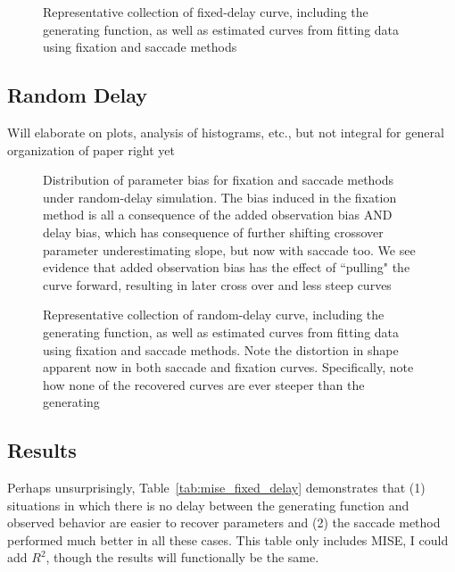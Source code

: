 \documentclass{article}
\begin{document}
\begin{figure}[H]
\centering
\caption{Representative collection of fixed-delay curve, including  the generating function, as well as estimated curves from fitting data using fixation and saccade methods}
\label{fig:fixed_pb_curves}
\end{figure}

\subsection{Random Delay}


Will elaborate on plots, analysis of histograms, etc., but not integral for general organization of paper right yet


\begin{figure}[H]
    \centering
\caption{Distribution of parameter bias for fixation and saccade methods under random-delay simulation. The bias induced in the fixation method is all a consequence of the added observation bias AND delay bias, which has consequence of further shifting crossover parameter underestimating slope, but now with saccade too. We see evidence that added observation bias has the effect of ``pulling" the curve forward, resulting in later cross over and less steep curves}
\label{fig:random_par_bias}
\end{figure}



\begin{figure}[H]
\centering
\caption{Representative collection of random-delay curve, including  the generating function, as well as estimated curves from fitting data using fixation and saccade methods. Note the distortion in shape apparent now in both saccade and fixation curves. Specifically, note how none of the recovered curves are ever steeper than the generating}
\label{fig:random_pb_curves}
\end{figure}

\subsection{Results}

Perhaps unsurprisingly, Table~\ref{tab:mise_fixed_delay} demonstrates that (1) situations in which there is no delay between the generating function and observed behavior are easier to recover parameters and (2) the saccade method performed much better in all these cases. This table only includes MISE, I could add $R^2$, though the results will functionally be the same.
\end{document}
